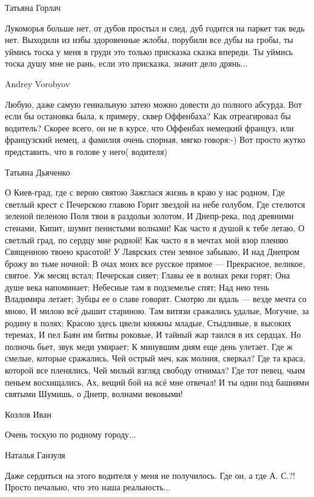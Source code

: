 Татьяна Горлач

Лукоморья больше нет, от дубов простыл и след, дуб годится на паркет так ведь
нет. Выходили из избы здоровенные жлобы, порубили все дубы на гробы, ты уймись
тоска у меня в груди это только присказка сказка впереди. Ты уймись тоска душу
мне не рань, если это присказка, значит дело дрянь...

Andrey Vorobyov

Любую, даже самую гениальную затею можно довести до полного абсурда. Вот если
бы остановка была, к примеру, сквер Оффенбаха? Как отреагировал бы водитель?
Скорее всего, он не в курсе, что Оффенбах немецкий француз, или французский
немец, а фамилия очень спорная, мягко говоря:-) Вот просто жутко представить,
что в голове у него( водителя)

Татьяна Дьяченко

О Киев-град, где с верою святою
Зажглася жизнь в краю у нас родном,
Где светлый крест с Печерскою главою
Горит звездой на небе голубом,
Где стелются зеленой пеленою
Поля твои в раздольи золотом,
И Днепр-река, под древними стенами,
Кипит, шумит пенистыми волнами!
Как часто я душой к тебе летаю,
О светлый град, по сердцу мне родной!
Как часто я в мечтах мой взор пленяю
Священною твоею красотой!
У Лаврских стен земное забываю,
И над Днепром брожу во тьме ночной:
В очах моих все русское прямое —
Прекрасное, великое, святое.
Уж месяц встал; Печерская сияет;
Главы ее в волнах реки горят;
Она душе века напоминает;
Небесные там в подземелье спят;
Над нею тень Владимира летает;
Зубцы ее о славе говорят.
Смотрю ли вдаль — везде мечта со мною,
И милою всё дышит стариною.
Там витязи сражались удалые,
Могучие, за родину в полях;
Красою здесь цвели княжны младые,
Стыдливые, в высоких теремах,
И пел Баян им битвы роковые,
И тайный жар таился в их сердцах.
Но полночь бьет, звук меди умирает;
К минувшим дням еще день улетает.
Где ж смелые, которые сражались,
Чей острый меч, как молния, сверкал?
Где та краса, которой все пленялись,
Чей милый взгляд свободу отнимал?
Где тот певец, чьим пеньем восхищались,
Ах, вещий бой на всё мне отвечал!
И ты один под башнями святыми
Шумишь, о Днепр, волнами вековыми!

Козлов Иван

Очень тоскую по родному городу...

Наталья Ганзуля

Даже сердиться на этого водителя у меня не получилось. Где он, а где А. С.?!
Просто печально, что это наша реальность...
